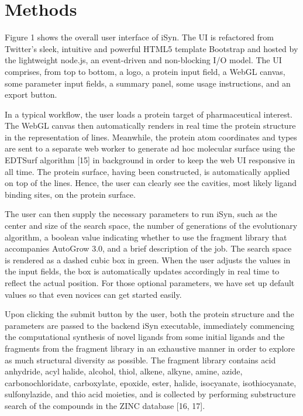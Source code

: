 \section{Methods}

Figure 1 shows the overall user interface of iSyn. The UI is refactored from Twitter’s sleek, intuitive and powerful HTML5 template Bootstrap and hosted by the lightweight node.js, an event-driven and non-blocking I/O model. The UI comprises, from top to bottom, a logo, a protein input field, a WebGL canvas, some parameter input fields, a summary panel, some usage instructions, and an export button.

In a typical workflow, the user loads a protein target of pharmaceutical interest. The WebGL canvas then automatically renders in real time the protein structure in the representation of lines. Meanwhile, the protein atom coordinates and types are sent to a separate web worker to generate ad hoc molecular surface using the EDTSurf algorithm [15] in background in order to keep the web UI responsive in all time. The protein surface, having been constructed, is automatically applied on top of the lines. Hence, the user can clearly see the cavities, most likely ligand binding sites, on the protein surface.

The user can then supply the necessary parameters to run iSyn, such as the center and size of the search space, the number of generations of the evolutionary algorithm, a boolean value indicating whether to use the fragment library that accompanies AutoGrow 3.0, and a brief description of the job. The search space is rendered as a dashed cubic box in green. When the user adjusts the values in the input fields, the box is automatically updates accordingly in real time to reflect the actual position. For those optional parameters, we have set up default values so that even novices can get started easily.

Upon clicking the submit button by the user, both the protein structure and the parameters are passed to the backend iSyn executable, immediately commencing the computational synthesis of novel ligands from some initial ligands and the fragments from the fragment library in an exhaustive manner in order to explore as much structural diversity as possible. The fragment library contains acid anhydride, acyl halide, alcohol, thiol, alkene, alkyne, amine, azide, carbonochloridate, carboxylate, epoxide, ester, halide, isocyanate, isothiocyanate, sulfonylazide, and thio acid moieties, and is collected by performing substructure search of the compounds in the ZINC database [16, 17].

